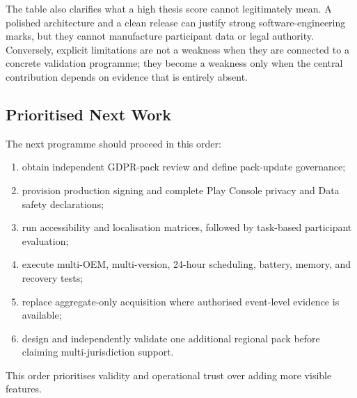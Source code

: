 The table also clarifies what a high thesis score cannot legitimately mean. A polished architecture and a clean release can justify strong software-engineering marks, but they cannot manufacture participant data or legal authority. Conversely, explicit limitations are not a weakness when they are connected to a concrete validation programme; they become a weakness only when the central contribution depends on evidence that is entirely absent.

\subsection{Prioritised Next Work}

The next programme should proceed in this order:

\begin{enumerate}
    \item obtain independent GDPR-pack review and define pack-update governance;
    \item provision production signing and complete Play Console privacy and Data safety declarations;
    \item run accessibility and localisation matrices, followed by task-based participant evaluation;
    \item execute multi-OEM, multi-version, 24-hour scheduling, battery, memory, and recovery tests;
    \item replace aggregate-only acquisition where authorised event-level evidence is available;
    \item design and independently validate one additional regional pack before claiming multi-jurisdiction support.
\end{enumerate}

This order prioritises validity and operational trust over adding more visible features.
